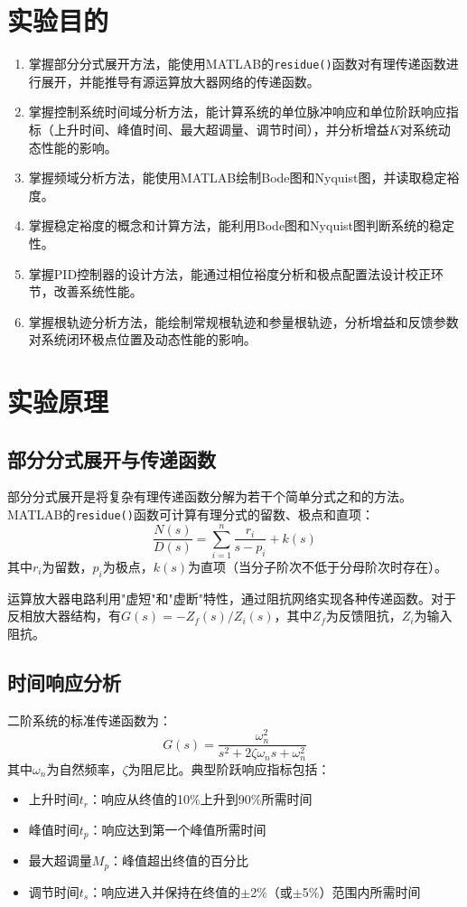 \documentclass{../common/SCNU_Experimental_Report}
\begin{document}
\maketitle

\section{实验目的}
\begin{enumerate}
    \item 掌握部分分式展开方法，能使用MATLAB的\texttt{residue()}函数对有理传递函数进行展开，并能推导有源运算放大器网络的传递函数。
    \item 掌握控制系统时间域分析方法，能计算系统的单位脉冲响应和单位阶跃响应指标（上升时间、峰值时间、最大超调量、调节时间），并分析增益$K$对系统动态性能的影响。
    \item 掌握频域分析方法，能使用MATLAB绘制Bode图和Nyquist图，并读取稳定裕度。
    \item 掌握稳定裕度的概念和计算方法，能利用Bode图和Nyquist图判断系统的稳定性。
    \item 掌握PID控制器的设计方法，能通过相位裕度分析和极点配置法设计校正环节，改善系统性能。
    \item 掌握根轨迹分析方法，能绘制常规根轨迹和参量根轨迹，分析增益和反馈参数对系统闭环极点位置及动态性能的影响。
\end{enumerate}

\section{实验原理}
\subsection{部分分式展开与传递函数}
部分分式展开是将复杂有理传递函数分解为若干个简单分式之和的方法。MATLAB的\texttt{residue()}函数可计算有理分式的留数、极点和直项：
\[
\frac{N(s)}{D(s)} = \sum_{i=1}^{n} \frac{r_i}{s - p_i} + k(s)
\]
其中$r_i$为留数，$p_i$为极点，$k(s)$为直项（当分子阶次不低于分母阶次时存在）。

运算放大器电路利用"虚短"和"虚断"特性，通过阻抗网络实现各种传递函数。对于反相放大器结构，有$G(s) = -Z_f(s)/Z_i(s)$，其中$Z_f$为反馈阻抗，$Z_i$为输入阻抗。

\subsection{时间响应分析}
二阶系统的标准传递函数为：
\[
G(s) = \frac{\omega_n^2}{s^2 + 2\zeta\omega_n s + \omega_n^2}
\]
其中$\omega_n$为自然频率，$\zeta$为阻尼比。典型阶跃响应指标包括：
\begin{itemize}
    \item 上升时间$t_r$：响应从终值的10\%上升到90\%所需时间
    \item 峰值时间$t_p$：响应达到第一个峰值所需时间
    \item 最大超调量$M_p$：峰值超出终值的百分比
    \item 调节时间$t_s$：响应进入并保持在终值的$\pm$2\%（或$\pm$5\%）范围内所需时间
\end{itemize}
\end{document}
